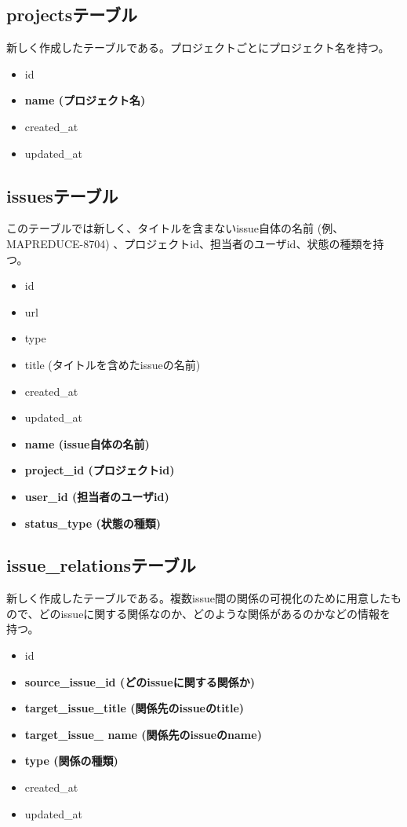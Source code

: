 \documentclass[12pt, oneside]{jreport}
\begin{document}
		\subsection{projectsテーブル}
		新しく作成したテーブルである。プロジェクトごとにプロジェクト名を持つ。
		\begin{itemize}
		\item id
		\item {\bf name (プロジェクト名)}
		\item created\_at
		\item updated\_at
		\end{itemize}
		
		\subsection{issuesテーブル}
		このテーブルでは新しく、タイトルを含まないissue自体の名前 (例、MAPREDUCE-8704) 、プロジェクトid、担当者のユーザid、状態の種類を持つ。
		\begin{itemize}
		\item id
		\item url
		\item type
		\item title (タイトルを含めたissueの名前)
		\item created\_at
		\item updated\_at
		\item {\bf name (issue自体の名前)}
		\item {\bf project\_id (プロジェクトid)}
		\item {\bf user\_id (担当者のユーザid)}
		\item {\bf status\_type (状態の種類)}
		\end{itemize}
				
		\subsection{issue\_relationsテーブル}
		新しく作成したテーブルである。複数issue間の関係の可視化のために用意したもので、どのissueに関する関係なのか、どのような関係があるのかなどの情報を持つ。
		\begin{itemize}
		\item id
		\item {\bf source\_issue\_id (どのissueに関する関係か)}
		\item {\bf target\_issue\_title (関係先のissueのtitle)}
		\item {\bf target\_issue\_ name (関係先のissueのname)}
		\item {\bf type (関係の種類)}
		\item created\_at
		\item updated\_at
		\end{itemize}
\end{document}
